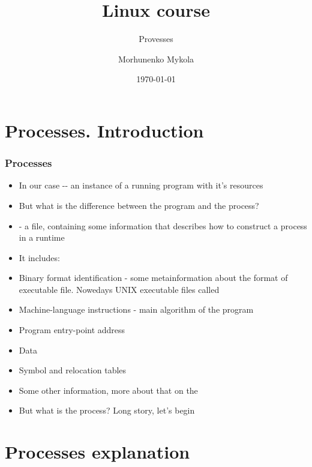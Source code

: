 \documentclass[usenames,dvipsnames,10pt,aspectratio=169]{beamer}
\title{Linux course}
\subtitle{Provesses}
\date[\today]{\small\today}
\author[Morhunenko Mykola]{Morhunenko Mykola}
\institute{APPS@UCU}
\begin{document}
\begin{frame}[noframenumbering]
\titlepage
\end{frame}

\begin{frame}{\contentsname}
    \tableofcontents
\end{frame}

\section{Processes. Introduction}
\begin{frame}
    \frametitle{Processes}
    \begin{itemize}
        \item In our case -- an instance of a running program with it's resources
        \item But what is the difference between the program and the process?
        \item {}- a file, containing some information that describes how to construct a process in a runtime
        \item It includes:
        \item Binary format identification - some metainformation about the format of executable file. Nowedays UNIX executable files called
        \item Machine-language instructions - main algorithm of the program
        \item Program entry-point address
        \item Data
        \item Symbol and relocation tables
        \item Some other information, more about that on the
        \item But what is the process? Long story, let's begin
    \end{itemize}
\end{frame}

\section{Processes explanation}
\end{document}
